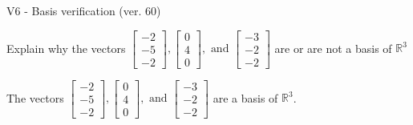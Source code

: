 \begin{exercise}
  \begin{exerciseTitle}V6 - Basis verification (ver. 60)\end{exerciseTitle}
  \begin{exerciseStatement}
    Explain why the vectors \(\left[\begin{array}{r}
-2 \\
-5 \\
-2
\end{array}\right] , \left[\begin{array}{r}
0 \\
4 \\
0
\end{array}\right] , \text{ and } \left[\begin{array}{r}
-3 \\
-2 \\
-2
\end{array}\right]\) are or are not a basis of \(\mathbb{R}^3\)	


  \end{exerciseStatement}
  \begin{exerciseAnswer}
   The vectors \(\left[\begin{array}{r}
-2 \\
-5 \\
-2
\end{array}\right] , \left[\begin{array}{r}
0 \\
4 \\
0
\end{array}\right] , \text{ and } \left[\begin{array}{r}
-3 \\
-2 \\
-2
\end{array}\right]\) 
  	 are  a basis of \(\mathbb{R}^3\).
  


  \end{exerciseAnswer}
\end{exercise}